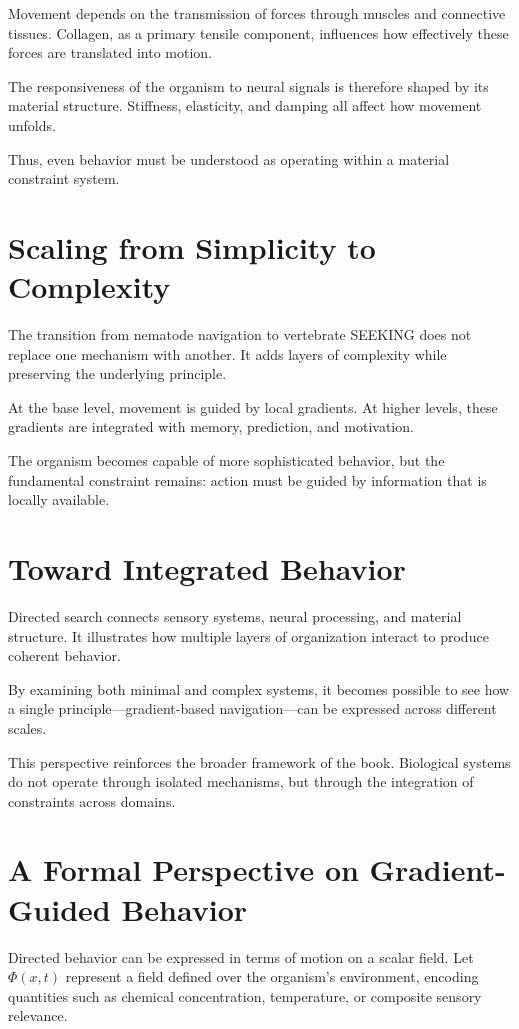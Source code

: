 \documentclass[11pt,oneside]{book}
\begin{document}
Movement depends on the transmission of forces through muscles and connective tissues. Collagen, as a primary tensile component, influences how effectively these forces are translated into motion.

The responsiveness of the organism to neural signals is therefore shaped by its material structure. Stiffness, elasticity, and damping all affect how movement unfolds.

Thus, even behavior must be understood as operating within a material constraint system.

\section{Scaling from Simplicity to Complexity}

The transition from nematode navigation to vertebrate SEEKING does not replace one mechanism with another. It adds layers of complexity while preserving the underlying principle.

At the base level, movement is guided by local gradients. At higher levels, these gradients are integrated with memory, prediction, and motivation.

The organism becomes capable of more sophisticated behavior, but the fundamental constraint remains: action must be guided by information that is locally available.

\section{Toward Integrated Behavior}

Directed search connects sensory systems, neural processing, and material structure. It illustrates how multiple layers of organization interact to produce coherent behavior.

By examining both minimal and complex systems, it becomes possible to see how a single principle—gradient-based navigation—can be expressed across different scales.

This perspective reinforces the broader framework of the book. Biological systems do not operate through isolated mechanisms, but through the integration of constraints across domains.

\section{A Formal Perspective on Gradient-Guided Behavior}

Directed behavior can be expressed in terms of motion on a scalar field. Let $\Phi(x,t)$ represent a field defined over the organism’s environment, encoding quantities such as chemical concentration, temperature, or composite sensory relevance.
\end{document}
